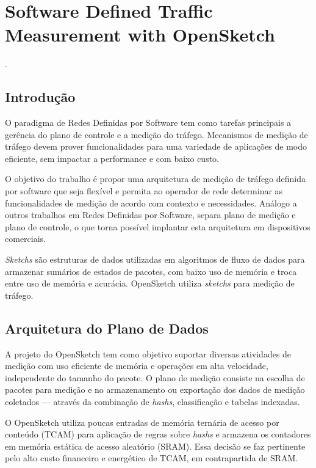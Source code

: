 
\chapter{Software Defined Traffic Measurement with OpenSketch}
 \cite{yu2013sketch}.


\section*{Introdução}

O paradigma de Redes Definidas por Software tem como tarefas principais a gerência do plano de controle e a medição do tráfego. Mecanismos de medição de tráfego devem prover funcionalidades para uma variedade de aplicações de modo eficiente, sem impactar a performance e com baixo custo.

O objetivo do trabalho é propor uma arquitetura de medição de tráfego definida por software que seja flexível e permita ao operador de rede determinar as funcionalidades de medição de acordo com contexto e necessidades. Análogo a outros trabalhos em Redes Definidas por Software, separa plano de medição e plano de controle, o que torna possível implantar esta arquitetura em dispositivos comerciais.

\textit{Sketchs} são estruturas de dados utilizadas em algoritmos de fluxo de dados para armazenar sumários de estados de pacotes, com baixo uso de memória e troca entre uso de memória e acurácia. OpenSketch utiliza \textit{sketchs} para medição de tráfego.


\section*{Arquitetura do Plano de Dados}

A projeto do OpenSketch tem como objetivo suportar diversas atividades de medição com uso eficiente de memória e operações em alta velocidade, independente do tamanho do pacote. O plano de medição consiste na escolha de pacotes para medição e no armazenamento ou exportação dos dados de medição coletados --- através da combinação de \textit{hashs}, classificação e tabelas indexadas.

O OpenSketch utiliza poucas entradas de memória ternária de acesso por conteúdo (TCAM) para aplicação de regras sobre \textit{hashs} e armazena os contadores em memória estática de acesso aleatório (SRAM). Essa decisão se faz pertinente pelo alto custo financeiro e energético de TCAM, em contrapartida de SRAM.

